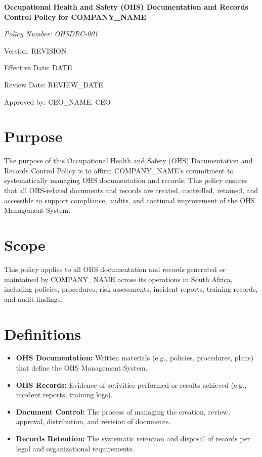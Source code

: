\documentclass[12pt]{article}
\begin{document}
\begin{titlepage}
    \centering
    \vspace*{2cm}
    {\LARGE\bfseries Occupational Health and Safety (OHS) Documentation and Records Control Policy for {{COMPANY_NAME}}\par}
    \vspace{1cm}
    {\large\itshape Policy Number: OHSDRC-001\par}
    \vspace{0.5cm}
    {\normalsize Version: {{REVISION}}\par}
    \vspace{0.5cm}
    {\normalsize Effective Date: {{DATE}}\par}
    \vspace{0.5cm}
    {\normalsize Review Date: {{REVIEW_DATE}}\par}
    \vspace{2cm}
    {\normalsize Approved by: {{CEO_NAME}}, CEO\par}
\end{titlepage}

\section{Purpose}
The purpose of this Occupational Health and Safety (OHS) Documentation and Records Control Policy is to affirm {{COMPANY_NAME}}'s commitment to systematically managing OHS documentation and records. This policy ensures that all OHS-related documents and records are created, controlled, retained, and accessible to support compliance, audits, and continual improvement of the OHS Management System.

\section{Scope}
This policy applies to all OHS documentation and records generated or maintained by {{COMPANY_NAME}} across its operations in South Africa, including policies, procedures, risk assessments, incident reports, training records, and audit findings.

\section{Definitions}
\begin{itemize}
    \item \textbf{OHS Documentation:} Written materials (e.g., policies, procedures, plans) that define the OHS Management System.
    \item \textbf{OHS Records:} Evidence of activities performed or results achieved (e.g., incident reports, training logs).
    \item \textbf{Document Control:} The process of managing the creation, review, approval, distribution, and revision of documents.
    \item \textbf{Records Retention:} The systematic retention and disposal of records per legal and organizational requirements.
\end{itemize}
\end{document}
